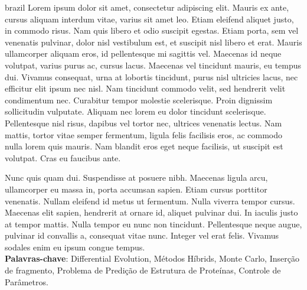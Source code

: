 \begin{resumo}[Resumo]
  \begin{otherlanguage*}{brazil}
    Lorem ipsum dolor sit amet, consectetur adipiscing elit. Mauris ex ante, cursus aliquam interdum vitae, varius sit amet leo. Etiam eleifend aliquet justo, in commodo risus. Nam quis libero et odio suscipit egestas. Etiam porta, sem vel venenatis pulvinar, dolor nisl vestibulum est, et suscipit nisl libero et erat. Mauris ullamcorper aliquam eros, id pellentesque mi sagittis vel. Maecenas id neque volutpat, varius purus ac, cursus lacus. Maecenas vel tincidunt mauris, eu tempus dui. Vivamus consequat, urna at lobortis tincidunt, purus nisl ultricies lacus, nec efficitur elit ipsum nec nisl. Nam tincidunt commodo velit, sed hendrerit velit condimentum nec. Curabitur tempor molestie scelerisque. Proin dignissim sollicitudin vulputate. Aliquam nec lorem eu dolor tincidunt scelerisque. Pellentesque nisl risus, dapibus vel tortor nec, ultrices venenatis lectus. Nam mattis, tortor vitae semper fermentum, ligula felis facilisis eros, ac commodo nulla lorem quis mauris. Nam blandit eros eget neque facilisis, ut suscipit est volutpat. Cras eu faucibus ante.

    Nunc quis quam dui. Suspendisse at posuere nibh. Maecenas ligula arcu, ullamcorper eu massa in, porta accumsan sapien. Etiam cursus porttitor venenatis. Nullam eleifend id metus ut fermentum. Nulla viverra tempor cursus. Maecenas elit sapien, hendrerit at ornare id, aliquet pulvinar dui. In iaculis justo at tempor mattis. Nulla tempor eu nunc non tincidunt. Pellentesque neque augue, pulvinar id convallis a, consequat vitae nunc. Integer vel erat felis. Vivamus sodales enim eu ipsum congue tempus.
    \\
    \vspace{\onelineskip}
    \noindent
    \textbf{Palavras-chave}: Differential Evolution, Métodos Híbrids, Monte Carlo, Inserção de fragmento, Problema de Predição de Estrutura de Proteínas, Controle de Parâmetros.
  \end{otherlanguage*}
\end{resumo}

\listoffigures*
\cleardoublepage

\listoftables*
\cleardoublepage
